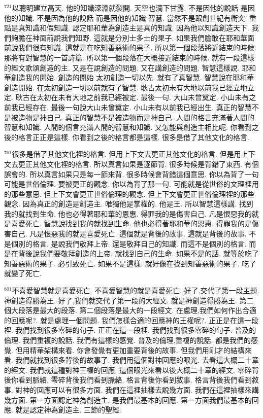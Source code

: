 \documentclass{book}
\begin{document}
$^{721}$以聰明建立高天.
他的知識深淵就裂開.
天空也滴下甘露.
不是因他的說話 是因他的知識.
不是因為他的說話 而是因他的知識 智慧.
當然不是跟創世紀有衝突.
重點是真知識和假知識.
認定耶和華為創造主是真的知識.
因為他以知識創造天下.
我們夠膽在神面前說我們知野.
這就是分別士多士的果子.
如果我們膽敢在耶和華面前說我們很有知識.
這就是在吃知善惡術的果子.
所以第一個段落將近結束的時候.
那將有對智慧的一首詩篇.
所以第一個段落在大概接近結束的時候.
就有一段這樣的經文歌頌創造的主.
又是在說創造的問題.
又在講創造的問題.
智慧這樣說.
耶和華創造我的開始.
創造的開始 太初創造一切以先.
就有了真智慧.
智慧說在耶和華創造開始.
在太初創造一切以前就有了智慧.
耿古太初未有大地以前我已經立地立定.
耿古在太初在未有大地之前我已經被定.
最後一句.
大山未曾奠定.
小山未有之前我已經存在.
最後一句說大山未曾奠定.
小山未有以前我已經出生.
真正的智慧不是被造物是神自己.
真正的智慧不是被造物而是神自己.
人間的格言充滿著人間的智慧和知識.
人間的個言充滿人間的智慧和知識.
又怎能與創造主相比呢.
你看到之後的格言正正是這樣.
你看到之後的格言都是這樣.
很多是借了其他文化的格言.

$^{761}$很多是借了其他文化裡的格言.
但用上下文去更正其他文化的格言.
但是用上下文去更正其他文化裡的格言.
所以真言如果是逐節背.
很多時候是背錯了東西.
有個誤會的.
所以真言如果只是每一節來背.
很多時候會背錯這個意思.
你以為背了一句可能是世俗倫理.
要被更正的觀念.
你以為背了那一句.
可能就是從世俗的文理裡用的那些意思.
但上下文會更正世俗倫理的觀念.
但上下文會更正世俗倫理裡的那些觀念.
因為真正的創造是創造主.
唯獨他是掌權的.
他是王.
所以智慧這樣講.
找到我的就找到生命.
他也必得著耶和華的恩惠.
得罪我的是傷害自己.
凡是恨惡我的就是喜愛死亡.
智慧說找到我的就找到生命.
他也必得著耶和華的恩惠.
得罪我的是傷害自己.
凡是恨惡我的就是喜愛死亡.
這個就是背後的故事.
這就是背後的故事.
不是個別的格言.
是說我們敬拜上帝.
還是敬拜自己的知識.
而這不是個別的格言.
而是在背後說我們要敬拜創造的上帝.
就找到自己的生命.
如果不是的話.
就等於吃了知善惡術的果子.
必引致死亡.
如果不是這樣.
就好像在找到知善惡術的果子.
吃了就變了死亡.

$^{801}$不喜愛智慧就是喜愛死亡.
不喜愛智慧的就是喜愛死亡.
好了,交代了第一段主題.
神創造得勝為王.
好了,我們就交代了第一段的大經文.
就是神創造得勝為王.
第二個大段落是最大的段落.
第二個段落是最大的一段經文.
在處理,我們如何作出合適的回應呢?.
就是處理一個問題.
我們怎樣合適的回應神的王權呢?.
正正是在這一段裡.
我們找到很多零碎的句子.
正正在這一段裡.
我們找到很多零碎的句子.
普及的倫理.
我們重複的說話.
我們有這樣的感覺.
普及的倫理,重複的說話.
都是我們的感覺.
但用精華架構來看.
你會發覺有更加重要背後的故事.
但我們用剛才的結構來看.
我們就找到很多背後的故事了.
我們用這個對神回應的眼光.
去看這大概二十章的經文.
我們就這種對神王權的回應.
這個眼光來看以後大概二十章的經文.
零碎背後你看到脈絡.
零碎背後我們看到脈絡.
格言背後你看到敘事.
格言背後我們看到敘事.
對神的回應可以有很多方面.
我們在這裡抽樣去說幾方面.
我們在這裡抽樣來講幾方面.
第一方面認定神為創造主.
是我們最基本的回應.
第一方面我們最基本的回應.
就是認定神為創造主.
三節的聖經.
\end{document}
